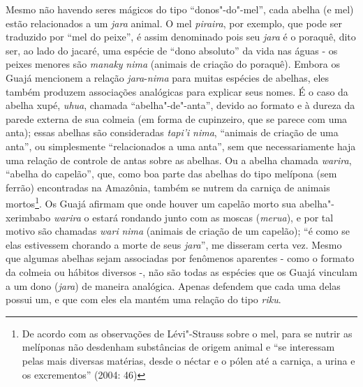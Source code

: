 Mesmo não havendo seres mágicos do tipo ``donos"-do"-mel'', cada abelha (e
mel) estão relacionados a um \emph{jara} animal. O mel \emph{piraira},
por exemplo, que pode ser traduzido por ``mel do peixe'', é assim
denominado pois seu \emph{jara} é o poraquê, dito ser, ao lado do
jacaré, uma espécie de ``dono absoluto'' da vida nas águas - os peixes
menores são \emph{manaky} \emph{nima} (animais de criação do poraquê).
Embora os Guajá mencionem a relação \emph{jara}-\emph{nima} para muitas
espécies de abelhas, eles também produzem associações analógicas para
explicar seus nomes. É o caso da abelha xupé, \emph{uhua}, chamada
``abelha"-de"-anta'', devido ao formato e à dureza da parede externa de sua
colmeia (em forma de cupinzeiro, que se parece com uma anta); essas
abelhas são consideradas \emph{tapi'i} \emph{nima}, ``animais de criação
de uma anta'', ou simplesmente ``relacionados a uma anta'', sem que
necessariamente haja uma relação de controle de antas sobre as abelhas.
Ou a abelha chamada \emph{warira}, ``abelha do capelão'', que, como boa
parte das abelhas do tipo melípona (sem ferrão) encontradas na Amazônia,
também se nutrem da carniça de animais mortos\footnote{De acordo com as
  observações de Lévi"-Strauss sobre o mel, para se nutrir as melíponas
  não desdenham substâncias de origem animal e ``se interessam pelas mais
diversas matérias, desde o néctar e o pólen até a carniça, a urina e
os excrementos'' (2004: 46)}. Os Guajá afirmam que onde houver um
capelão morto sua abelha"-xerimbabo \emph{warira} o estará rondando junto
com as moscas (\emph{merua}), e por tal motivo são chamadas \emph{wari}
\emph{nima} (animais de criação de um capelão); ``é como se elas
estivessem chorando a morte de seus \emph{jara}'', me disseram certa vez.
Mesmo que algumas abelhas sejam associadas por fenômenos aparentes -
como o formato da colmeia ou hábitos diversos -, não são todas as
espécies que os Guajá vinculam a um dono (\emph{jara}) de maneira
analógica. Apenas defendem que cada uma delas possui um, e que com eles
ela mantém uma relação do tipo \emph{riku}.


